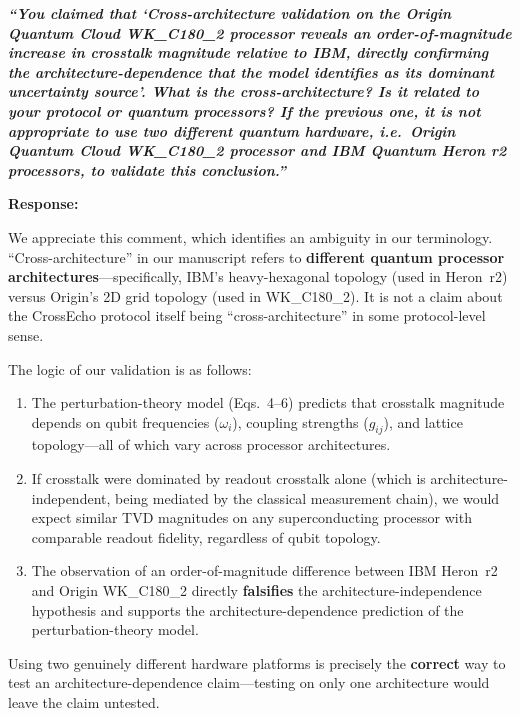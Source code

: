 \documentclass[11pt,a4paper]{article}
\begin{document}
\noindent\textbf{\textit{``You claimed that `Cross-architecture validation on the Origin
Quantum Cloud WK\_C180\_2 processor reveals an order-of-magnitude increase in crosstalk
magnitude relative to IBM, directly confirming the architecture-dependence that the model
identifies as its dominant uncertainty source'. What is the cross-architecture? Is it
related to your protocol or quantum processors? If the previous one, it is not appropriate
to use two different quantum hardware, i.e.\ Origin Quantum Cloud WK\_C180\_2 processor
and IBM Quantum Heron r2 processors, to validate this conclusion.''}}

\medskip\noindent\textbf{Response:}

We appreciate this comment, which identifies an ambiguity in our terminology.
``Cross-architecture'' in our manuscript refers to \textbf{different quantum processor
architectures}---specifically, IBM's heavy-hexagonal topology (used in Heron~r2) versus
Origin's 2D grid topology (used in WK\_C180\_2). It is not a claim about the CrossEcho
protocol itself being ``cross-architecture'' in some protocol-level sense.

The logic of our validation is as follows:

\begin{enumerate}[leftmargin=*]
    \item The perturbation-theory model (Eqs.~4--6) predicts that crosstalk magnitude
    depends on qubit frequencies ($\omega_i$), coupling strengths ($g_{ij}$), and lattice
    topology---all of which vary across processor architectures.
    \item If crosstalk were dominated by readout crosstalk alone (which is
    architecture-independent, being mediated by the classical measurement chain), we would
    expect similar TVD magnitudes on any superconducting processor with comparable readout
    fidelity, regardless of qubit topology.
    \item The observation of an order-of-magnitude difference between IBM Heron~r2 and
    Origin WK\_C180\_2 directly \textbf{falsifies} the architecture-independence
    hypothesis and supports the architecture-dependence prediction of the
    perturbation-theory model.
\end{enumerate}

Using two genuinely different hardware platforms is precisely the \textbf{correct} way to
test an architecture-dependence claim---testing on only one architecture would leave the
claim untested.
\end{document}
